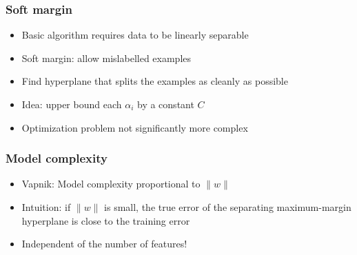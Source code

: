 \documentclass[10pt]{beamer}
\begin{document}
\begin{frame}
  \frametitle{Soft margin}
  \begin{itemize}
    \item Basic algorithm requires data to be linearly separable
	\item {\color{red} Soft margin}: allow mislabelled examples 
	\item Find hyperplane that splits the examples as cleanly as possible
	\item Idea: upper bound each $\alpha_i$ by a constant $C$
	\item Optimization problem not significantly more complex
  \end{itemize}
\end{frame}

\begin{frame}
  \frametitle{Model complexity}
  \begin{itemize}
    \item Vapnik: Model complexity proportional to $\|w\|$
	\item Intuition: if $\|w\|$ is small, the true error of the separating maximum-margin
	hyperplane is close to the training error
	\item Independent of the number of features!
  \end{itemize}
\end{frame}

\end{document}
